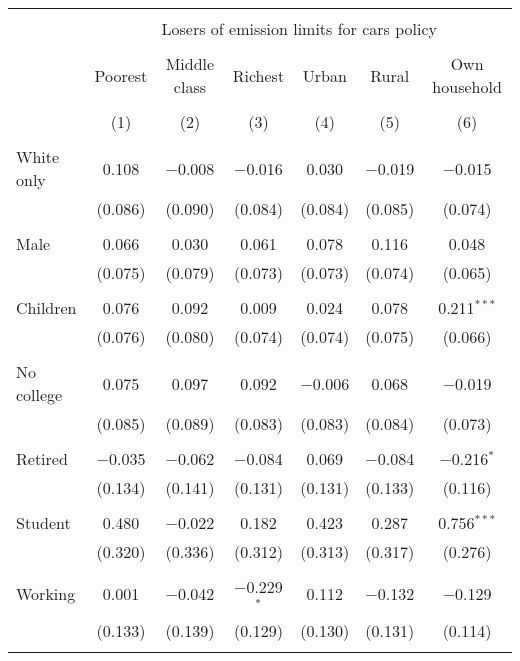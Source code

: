 
\begin{tabular}{@{\extracolsep{5pt}}lcccccc} 
\\[-1.8ex]\hline 
\hline \\[-1.8ex] 
 & \multicolumn{6}{c}{Losers of emission limits for cars policy} \\ 
\cline{2-7} 
\\[-1.8ex] & Poorest & Middle class & Richest & Urban & Rural & Own household \\ 
\\[-1.8ex] & (1) & (2) & (3) & (4) & (5) & (6)\\ 
\hline \\[-1.8ex] 
 White only & 0.108 & $-$0.008 & $-$0.016 & 0.030 & $-$0.019 & $-$0.015 \\ 
  & (0.086) & (0.090) & (0.084) & (0.084) & (0.085) & (0.074) \\ 
  & & & & & & \\ 
 Male & 0.066 & 0.030 & 0.061 & 0.078 & 0.116 & 0.048 \\ 
  & (0.075) & (0.079) & (0.073) & (0.073) & (0.074) & (0.065) \\ 
  & & & & & & \\ 
 Children & 0.076 & 0.092 & 0.009 & 0.024 & 0.078 & 0.211$^{***}$ \\ 
  & (0.076) & (0.080) & (0.074) & (0.074) & (0.075) & (0.066) \\ 
  & & & & & & \\ 
 No college & 0.075 & 0.097 & 0.092 & $-$0.006 & 0.068 & $-$0.019 \\ 
  & (0.085) & (0.089) & (0.083) & (0.083) & (0.084) & (0.073) \\ 
  & & & & & & \\ 
 Retired & $-$0.035 & $-$0.062 & $-$0.084 & 0.069 & $-$0.084 & $-$0.216$^{*}$ \\ 
  & (0.134) & (0.141) & (0.131) & (0.131) & (0.133) & (0.116) \\ 
  & & & & & & \\ 
 Student & 0.480 & $-$0.022 & 0.182 & 0.423 & 0.287 & 0.756$^{***}$ \\ 
  & (0.320) & (0.336) & (0.312) & (0.313) & (0.317) & (0.276) \\ 
  & & & & & & \\ 
 Working & 0.001 & $-$0.042 & $-$0.229$^{*}$ & 0.112 & $-$0.132 & $-$0.129 \\ 
  & (0.133) & (0.139) & (0.129) & (0.130) & (0.131) & (0.114) \\ 
  & & & & & & \\ 

\end{tabular}

